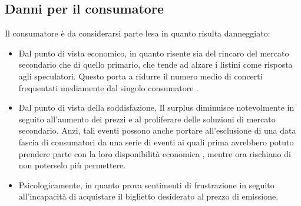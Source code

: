 \subsection{Danni per il consumatore}
Il consumatore è da considerarsi parte lesa in quanto risulta danneggiato: 
\begin{itemize}
\item Dal punto di vista economico, in quanto risente sia del rincaro del mercato secondario che di quello primario, che tende ad alzare i listini come risposta agli speculatori. Questo porta a ridurre il numero medio di concerti frequentati mediamente dal singolo consumatore \cite{eckard2013impact}.
\item Dal punto di vista della soddisfazione, Il surplus diminuisce notevolmente in seguito all'aumento dei prezzi e al proliferare delle soluzioni di mercato secondario. Anzi, tali eventi possono anche portare all'esclusione di una data fascia di consumatori da una serie di eventi ai quali prima avrebbero potuto prendere parte con la loro disponibilità economica \cite{perez2016music}, mentre ora rischiano di non poterselo più permettere.
\item Psicologicamente, in quanto prova sentimenti di frustrazione in seguito all'incapacità di acquistare il biglietto desiderato al prezzo di emissione. 
\end{itemize}

